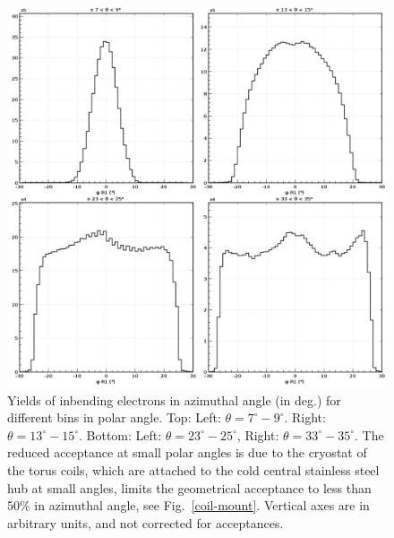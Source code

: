 \documentclass[final,3p,twocolumn]{elsarticle}
\begin{document}
\begin{figure}[t!]
\centerline{\includegraphics[width=0.85\columnwidth]{e_R1_phi_pub.png}}
\caption{Yields of inbending electrons in azimuthal angle (in deg.) for different bins in polar
  angle. Top: Left: $\theta = 7^\circ-9^\circ$. Right: $\theta = 13^\circ-15^\circ$. Bottom: Left: $\theta = 23^\circ-25^\circ$,
  Right: $\theta = 33^\circ-35^\circ$. The
  reduced acceptance at small polar angles is due to the cryostat of the torus coils, which are attached to 
  the cold central stainless steel hub at small angles, limits the geometrical acceptance to less than 
  50\% in azimuthal angle, see Fig.~\ref{coil-mount}. Vertical axes are in arbitrary units, and not corrected for 
  acceptances.  }
\label{e-accept-in}
\end{figure}
\end{document}
